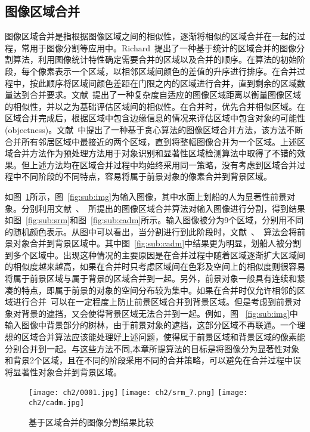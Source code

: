 \subsection{图像区域合并}
\label{sec:regionMerging}
图像区域合并是指根据图像区域之间的相似性，逐渐将相似的区域合并在一起的过程，常用于图像分割等应用中。Richard~\cite{Richard2004Statistical}提出了一种基于统计的区域合并的图像分割算法，利用图像统计特性确定需要合并的区域以及合并的顺序。在算法的初始阶段，每个像素表示一个区域，以相邻区域间颜色的差值的升序进行排序。在合并过程中，按此顺序将区域间颜色差距在门限之内的区域进行合并，直到剩余的区域数量达到合并要求。文献~提出了一种复杂度自适应的图像区域距离以衡量图像区域的相似性，并以之为基础评估区域间的相似性。在合并时，优先合并相似区域。在区域合并完成后，根据区域中包含边缘信息的情况来评估区域中包含对象的可能性(objectness)。文献~中提出了一种基于贪心算法的图像区域合并方法，该方法不断合并所有邻居区域中最接近的两个区域，直到将整幅图像合并为一个区域。上述区域合并方法作为预处理方法用于对象识别和显著性区域检测算法中取得了不错的效果。但上述方法均在区域合并过程中均始终采用同一策略，没有考虑到区域合并过程中不同阶段的不同特点，容易将属于前景对象的像素合并到背景区域。\par
如图~\ref{fig:rm}所示，图~\ref{fig:sub:img}为输入图像，其中水面上划船的人为显著性前景对象。分别利用文献~、~所提出的图像区域合并算法对输入图像进行分割，得到结果如图~\ref{fig:sub:srm}和图~\ref{fig:sub:cadm}所示。输入图像被分为9个区域，分别用不同的随机颜色表示。从图中可以看出，当分割进行到此阶段时，文献~、~算法会将前景对象合并到背景区域中。其中图~\ref{fig:sub:cadm}中结果更为明显，划船人被分割到多个区域中。出现这种情况的主要原因是在合并过程中随着区域逐渐扩大区域间的相似度越来越高，如果在合并时只考虑区域间在色彩及空间上的相似度则很容易将属于前景区域与属于背景的区域合并到一起。另外，前景对象一般具有连续和紧凑的特点，即属于前景的对象的空间分布较为集中。如果在合并时仅允许相邻的区域进行合并~\cite{SelectiveSearch}可以在一定程度上防止前景区域合并到背景区域。但是考虑到前景对象对背景的遮挡，又会使得背景区域无法合并到一起。例如，图 ~\ref{fig:sub:img}中输入图像中背景部分的树林，由于前景对象的遮挡，这部分区域不再联通。一个理想的区域合并算法应该能处理好上述问题，使得属于前景区域和背景区域的像素能分别合并到一起。与这些方法不同,本章所提算法的目标是将图像分为显著性对象和背景2个区域，且在不同的阶段采用不同的合并策略，可以避免在合并过程中误将显著性对象合并到背景区域。
\begin{figure}[htb]
  \centering%
    {\texttt{[image: ch2/0001.jpg]}}%
 \hspace{1em}%
      {\texttt{[image: ch2/srm\_7.png]}}
 \hspace{1em}
      {\texttt{[image: ch2/cadm.jpg]}}
  \caption{基于区域合并的图像分割结果比较}
  \label{fig:rm}
\end{figure}


